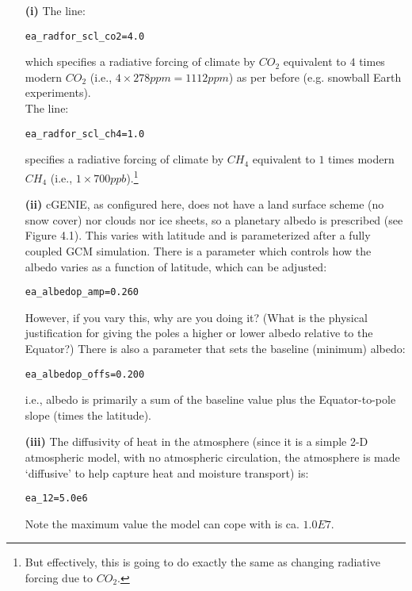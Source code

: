 \documentclass[11pt,fleqn]{book} %
\begin{document}
\begin{itemize}[noitemsep]

\item[\textbf{(i)}] The line:
\begin{verbatim}
ea_radfor_scl_co2=4.0
\end{verbatim}
which specifies a radiative forcing of climate by \(CO_{2}\) equivalent to \(4\) times modern \(CO_{2}\) (i.e., \(4\times278 ppm = 1112 ppm\)) as per before (e.g. snowball Earth experiments).
\\The line:
\begin{verbatim}
ea_radfor_scl_ch4=1.0
\end{verbatim}
specifies a radiative forcing of climate by \(CH_{4}\) equivalent to \(1\) times modern \(CH_{4}\) (i.e., \(1\times700 ppb\)).\footnote{But effectively, this is going to do exactly the same as changing radiative forcing due to \(CO_{2}\).}

\item[\textbf{(ii)}] cGENIE, as configured here, does not have a land surface scheme (no snow cover) nor clouds nor ice sheets, so a planetary albedo is prescribed (see Figure 4.1). This varies with latitude and is parameterized after a fully coupled GCM simulation. There is a parameter which controls how the albedo varies as a function of latitude, which can be adjusted:
\begin{verbatim}
ea_albedop_amp=0.260
\end{verbatim}
However, if you vary this, why are you doing it? (What is the physical justification for giving the poles a higher or lower albedo relative to the Equator?)
There is also a parameter that sets the baseline (minimum) albedo:
\begin{verbatim}
ea_albedop_offs=0.200
\end{verbatim}
i.e., albedo is primarily a sum of the baseline value plus the Equator-to-pole slope (times the latitude).

\item[\textbf{(iii)}] The diffusivity of heat in the atmosphere (since it is a simple 2-D atmospheric model, with no atmospheric circulation, the atmosphere is made ‘diffusive’ to help capture heat and moisture transport) is:
\begin{verbatim}
ea_12=5.0e6
\end{verbatim}
Note the maximum value the model can cope with is ca. \(1.0E7\).

\end{itemize}
\end{document}
